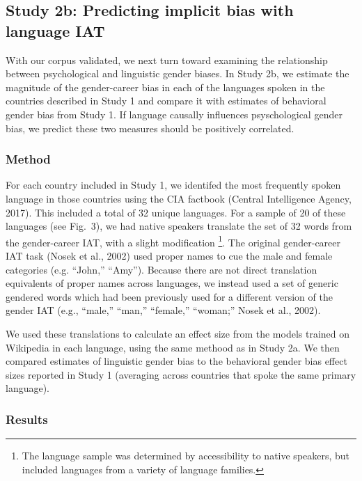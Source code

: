 \documentclass[10pt, letterpaper]{article}
\begin{document}
\subsection{Study 2b: Predicting implicit bias with language
IAT}\label{study-2b-predicting-implicit-bias-with-language-iat}

With our corpus validated, we next turn toward examining the
relationship between psychological and linguistic gender biases. In
Study 2b, we estimate the magnitude of the gender-career bias in each of
the languages spoken in the countries described in Study 1 and compare
it with estimates of behavioral gender bias from Study 1. If language
causally influences psyschological gender bias, we predict these two
measures should be positively correlated.

\subsubsection{Method}\label{method-2}

For each country included in Study 1, we identifed the most frequently
spoken language in those countries using the CIA factbook (Central
Intelligence Agency, 2017). This included a total of 32 unique
languages. For a sample of 20 of these languages (see Fig.~3), we had
native speakers translate the set of 32 words from the gender-career
IAT, with a slight modification
\footnote{The language sample was determined by accessibility to native speakers, but included languages from a variety of language families.}.
The original gender-career IAT task (Nosek et al., 2002) used proper
names to cue the male and female categories (e.g. ``John,'' ``Amy'').
Because there are not direct translation equivalents of proper names
across languages, we instead used a set of generic gendered words which
had been previously used for a different version of the gender IAT
(e.g., ``male,'' ``man,'' ``female,'' ``woman;'' Nosek et al., 2002).

We used these translations to calculate an effect size from the models
trained on Wikipedia in each language, using the same methood as in
Study 2a. We then compared estimates of linguistic gender bias to the
behavioral gender bias effect sizes reported in Study 1 (averaging
across countries that spoke the same primary language).

\subsubsection{Results}\label{results-2}
\end{document}
